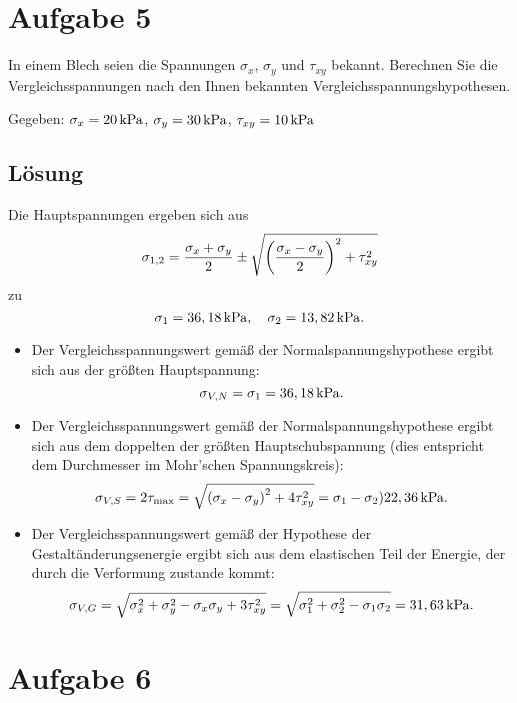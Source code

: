 \documentclass{exercise}
\begin{document}
    
    \section*{Aufgabe 5}
    
    \begin{problem}
        In einem Blech seien die Spannungen \(\sigma_x\), \(\sigma_y\) und \(\tau_{xy}\) bekannt.
        Berechnen Sie die Vergleichsspannungen nach den Ihnen bekannten Vergleichsspannungshypothesen.
        
        Gegeben: \(\sigma_x = 20\sis{\kilo\pascal}\), \(\sigma_y = 30\sis{\kilo\pascal}\), \(\tau_{xy} = 10\sis{\kilo\pascal}\)
    \end{problem}
    
    \subsection*{Lösung}
    Die Hauptspannungen ergeben sich aus
    \[
        \sigma_{1, 2} = \frac{\sigma_x + \sigma_y}{2} \pm \sqrt{\parentheses*{\frac{\sigma_x - \sigma_y}{2}}^2 + \tau_{xy}^2}
    \]
    zu
    \[
        \sigma_1 = 36,18\sis{\kilo\pascal}, \quad \sigma_2 = 13,82\sis{\kilo\pascal}.
    \]
    \begin{itemize}
        \item Der Vergleichsspannungswert gemäß der Normalspannungshypothese ergibt sich aus der größten Hauptspannung:
        \[
            \sigma_{V, N} = \sigma_1 = 36,18\sis{\kilo\pascal}.
        \]
        \item Der Vergleichsspannungswert gemäß der Normalspannungshypothese ergibt sich aus dem doppelten der größten Hauptschubspannung (dies entspricht dem Durchmesser im Mohr'schen Spannungskreis):
        \[
            \sigma_{V, S} = 2\tau_{\text{max}} = \sqrt{\parentheses*{\sigma_x - \sigma_y}^2 + 4\tau_{xy}^2} = \sigma_1 - \sigma_2 ) 22,36\sis{\kilo\pascal}.
        \]
        \item Der Vergleichsspannungswert gemäß der Hypothese der Gestaltänderungsenergie ergibt sich aus dem elastischen Teil der Energie, der durch die Verformung zustande kommt:
        \[
            \sigma_{V, G} = \sqrt{\sigma_x^2 + \sigma_y^2 - \sigma_x \sigma_y + 3\tau_{xy}^2} = \sqrt{\sigma_1^2 + \sigma_2^2 - \sigma_1 \sigma_2} = 31,63\sis{\kilo\pascal}.
        \]
    \end{itemize}


    \section*{Aufgabe 6}
\end{document}
